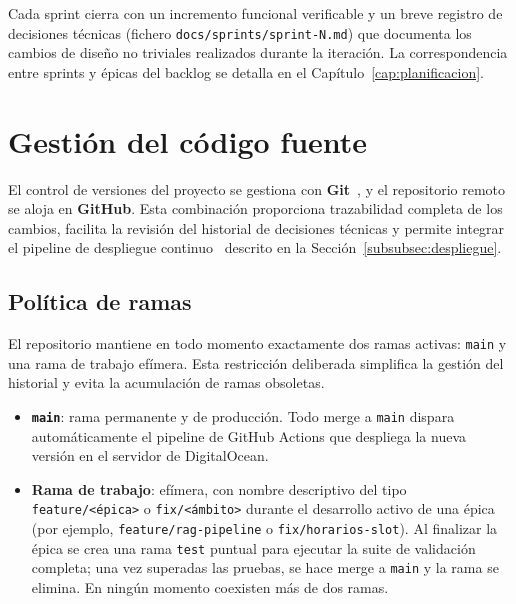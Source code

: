 Cada sprint cierra con un incremento funcional verificable y un breve registro de decisiones técnicas (fichero \texttt{docs/sprints/sprint-N.md}) que documenta los cambios de diseño no triviales realizados durante la iteración. La correspondencia entre sprints y épicas del backlog se detalla en el Capítulo~\ref{cap:planificacion}.

\section{Gestión del código fuente}
\label{sec:git}

El control de versiones del proyecto se gestiona con \textbf{Git}~\cite{chacon2014pro}, y el repositorio remoto se aloja en \textbf{GitHub}. Esta combinación proporciona trazabilidad completa de los cambios, facilita la revisión del historial de decisiones técnicas y permite integrar el pipeline de despliegue continuo~\cite{humble2010continuous} descrito en la Sección~\ref{subsubsec:despliegue}.

\subsection{Política de ramas}

El repositorio mantiene en todo momento exactamente dos ramas activas: \texttt{main} y una rama de trabajo efímera. Esta restricción deliberada simplifica la gestión del historial y evita la acumulación de ramas obsoletas.

\begin{itemize}
    \item \textbf{\texttt{main}}: rama permanente y de producción. Todo merge a \texttt{main} dispara automáticamente el pipeline de GitHub Actions que despliega la nueva versión en el servidor de DigitalOcean.

    \item \textbf{Rama de trabajo}: efímera, con nombre descriptivo del tipo \texttt{feature/\allowbreak<épica>} o \texttt{fix/\allowbreak<ámbito>} durante el desarrollo activo de una épica (por ejemplo, \texttt{feature/\allowbreak rag-pipeline} o \texttt{fix/\allowbreak horarios-slot}). Al finalizar la épica se crea una rama \texttt{test} puntual para ejecutar la suite de validación completa; una vez superadas las pruebas, se hace merge a \texttt{main} y la rama se elimina. En ningún momento coexisten más de dos ramas.
\end{itemize}


